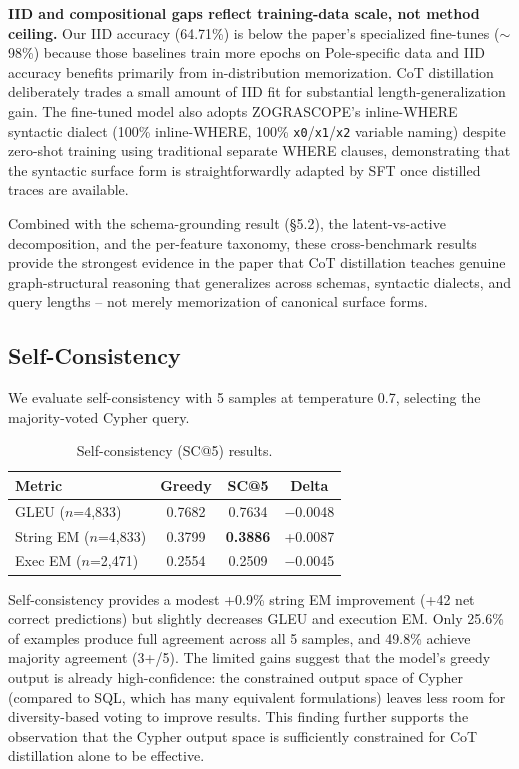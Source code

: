 \documentclass[11pt]{article}
\begin{document}
\textbf{IID and compositional gaps reflect training-data scale, not method ceiling.} Our IID accuracy (64.71\%) is below the paper's specialized fine-tunes (${\sim}$98\%) because those baselines train more epochs on Pole-specific data and IID accuracy benefits primarily from in-distribution memorization. CoT distillation deliberately trades a small amount of IID fit for substantial length-generalization gain. The fine-tuned model also adopts ZOGRASCOPE's inline-WHERE syntactic dialect (100\% inline-WHERE, 100\% \texttt{x0}/\texttt{x1}/\texttt{x2} variable naming) despite zero-shot training using traditional separate WHERE clauses, demonstrating that the syntactic surface form is straightforwardly adapted by SFT once distilled traces are available.

Combined with the schema-grounding result (\S5.2), the latent-vs-active decomposition, and the per-feature taxonomy, these cross-benchmark results provide the strongest evidence in the paper that CoT distillation teaches genuine graph-structural reasoning that generalizes across schemas, syntactic dialects, and query lengths -- not merely memorization of canonical surface forms.

\subsection{Self-Consistency}

We evaluate self-consistency with 5 samples at temperature 0.7, selecting the majority-voted Cypher query.

\begin{table}[h]
\centering
\caption{Self-consistency (SC@5) results.}
\label{tab:selfconsistency}
\begin{tabular}{lccc}
\toprule
\textbf{Metric} & \textbf{Greedy} & \textbf{SC@5} & \textbf{Delta} \\
\midrule
GLEU ($n$=4,833) & 0.7682 & 0.7634 & $-$0.0048 \\
String EM ($n$=4,833) & 0.3799 & \textbf{0.3886} & +0.0087 \\
Exec EM ($n$=2,471) & 0.2554 & 0.2509 & $-$0.0045 \\
\bottomrule
\end{tabular}
\end{table}

Self-consistency provides a modest +0.9\% string EM improvement (+42 net correct predictions) but slightly decreases GLEU and execution EM. Only 25.6\% of examples produce full agreement across all 5 samples, and 49.8\% achieve majority agreement (3+/5). The limited gains suggest that the model's greedy output is already high-confidence: the constrained output space of Cypher (compared to SQL, which has many equivalent formulations) leaves less room for diversity-based voting to improve results. This finding further supports the observation that the Cypher output space is sufficiently constrained for CoT distillation alone to be effective.
\end{document}
